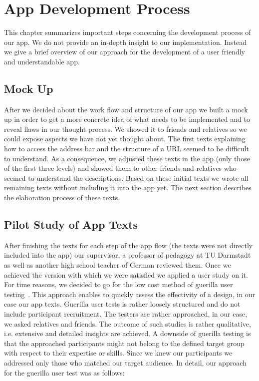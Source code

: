 
\section{App Development Process}
This chapter summarizes important steps concerning the development process of our app.
We do not provide an in-depth insight to our implementation. 
Instead we give a brief overview of our approach for the development of a user friendly and understandable app.
\subsection{Mock Up}
\label{s:mockup}
After we decided about the work flow and structure of our app we built a mock up in order to get a more concrete idea of what needs to be implemented and to reveal flaws in our thought process.
We showed it to friends and relatives so we could expose aspects we have not yet thought about.
The first texts explaining how to access the address bar and the structure of a URL seemed to be difficult to understand.
As a consequence, we adjusted these texts in the app (only those of the first three levels) and showed them to other friends and relatives who seemed to understand the descriptions.
Based on these initial texts we wrote all remaining texts without including it into the app yet.
The next section describes the elaboration process of these texts.
\subsection{Pilot Study of App Texts}
\label{s:pilot_study}
After finishing the texts for each step of the app flow (the texts were not directly included into the app) our supervisor, a professor of pedagogy at TU Darmstadt as well as another high school teacher of German reviewed them.
Once we achieved the version with which we were satisfied we applied a user study on it. 
For time reasons, we decided to go for the low cost method of guerilla user testing~\cite{guerillagovuk, guerillauxbooth}.
This approach enables to quickly assess the effectivity of a design, in our case our app texts.
Guerilla user tests is rather loosely structured and do not include participant recruitment.
The testers are rather approached, in our case, we asked relatives and friends. 
The outcome of such studies is rather qualitative, i.e. extensive and detailed insights are achieved.
A downside of guerilla testing is that the approached participants might not belong to the defined target group with respect to their expertise or skills. 
Since we knew our participants we addressed only those who matched our target audience. 
In detail, our approach for the guerilla user test was as follows:

